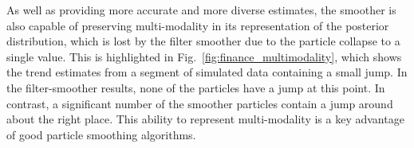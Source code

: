 \documentclass[peerreview,11pt,draftcls,onecolumn]{IEEEtran}
\begin{document}
%
%
%
%
As well as providing more accurate and more diverse estimates, the smoother is also capable of preserving multi-modality in its representation of the posterior distribution, which is lost by the filter smoother due to the particle collapse to a single value. This is highlighted in Fig.~\ref{fig:finance_multimodality}, which shows the trend estimates from a segment of simulated data containing a small jump. In the filter-smoother results, none of the particles have a jump at this point. In contrast, a significant number of the smoother particles contain a jump around about the right place. This ability to represent multi-modality is a key advantage of good particle smoothing algorithms.
%
\end{document}
